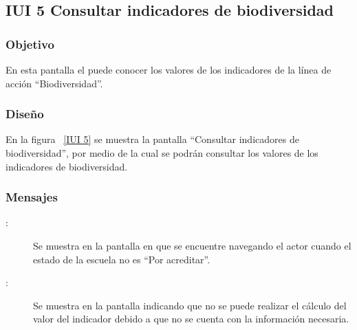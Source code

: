 \subsection{IUI 5 Consultar indicadores de biodiversidad}
\subsubsection{Objetivo}
	
	En esta pantalla el  puede conocer los valores de los indicadores
	de la línea de acción ``Biodiversidad''.	

\subsubsection{Diseño}

    En la figura ~\ref{IUI 5} se muestra la pantalla ``Consultar indicadores de biodiversidad'', por medio de la cual 
    se podrán consultar los valores de los indicadores de biodiversidad.


\subsubsection{Mensajes}

	
\begin{description}
	\item[:] Se muestra en la pantalla en que se encuentre navegando el actor cuando el estado de la escuela no es ``Por acreditar''.
	\item[:] Se muestra en la pantalla  indicando que no se puede realizar el cálculo del valor del indicador
				     debido a que no se cuenta con la información necesaria.
\end{description}
